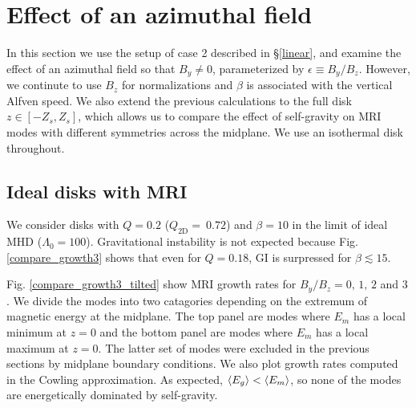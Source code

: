 \section{Effect of an azimuthal field}\label{result3}
In this section we use the setup of case 2 described in
\S\ref{linear}, and examine the effect of an azimuthal field so that
$B_y\neq 0$,   
parameterized by $\epsilon \equiv B_y/B_z$. However, we continute to
use $B_z$ for normalizations and $\beta$ is associated with the
vertical Alfven speed. We also extend the previous calculations to the
full disk $z\in[-Z_s,Z_s]$,  which allows us to compare the effect of
self-gravity on MRI modes with different symmetries across the
midplane. We use an isothermal disk throughout. 

\subsection{Ideal disks with MRI} 
We consider disks with $Q=0.2$ ($Q_\mathrm{2D}=~0.72$) and
$\beta=10$ in the limit of ideal MHD ($\Lambda_0=100$). Gravitational
instability is not expected because Fig. \ref{compare_growth3} shows
that even for $Q=0.18$, GI is surpressed for $\beta \lesssim 15$. 

Fig. \ref{compare_growth3_tilted} show MRI growth rates for
$B_y/B_z=0,\,1,\,2$ and $3$. We divide the modes into two catagories
depending on the extremum of magnetic energy at the midplane. 
The top panel are modes where $E_m$ has a local minimum at $z=0$ and 
the bottom panel are modes where $E_m$ has a local maximum at $z=0$. 
The latter set of modes were excluded in the previous sections by
midplane boundary conditions. 
We also plot growth rates computed in the Cowling
approximation. As expected,  $\langle{E_g}\rangle<\langle{E_m}\rangle$, so none of the
modes are energetically dominated by self-gravity. 



